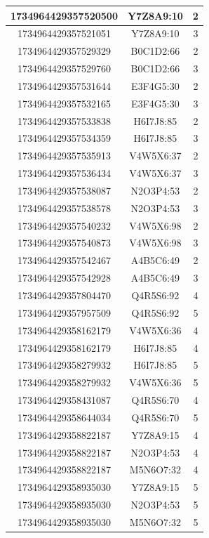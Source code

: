 \begin{table}[h]
\begin{tabular}{| c | c | c |}
		1734964429357520500 & Y7Z8A9:10 & 2 \\\hline
		1734964429357521051 & Y7Z8A9:10 & 3 \\\hline
		1734964429357529329 & B0C1D2:66 & 2 \\\hline
		1734964429357529760 & B0C1D2:66 & 3 \\\hline
		1734964429357531644 & E3F4G5:30 & 2 \\\hline
		1734964429357532165 & E3F4G5:30 & 3 \\\hline
		1734964429357533838 & H6I7J8:85 & 2 \\\hline
		1734964429357534359 & H6I7J8:85 & 3 \\\hline
		1734964429357535913 & V4W5X6:37 & 2 \\\hline
		1734964429357536434 & V4W5X6:37 & 3 \\\hline
		1734964429357538087 & N2O3P4:53 & 2 \\\hline
		1734964429357538578 & N2O3P4:53 & 3 \\\hline
		1734964429357540232 & V4W5X6:98 & 2 \\\hline
		1734964429357540873 & V4W5X6:98 & 3 \\\hline
		1734964429357542467 & A4B5C6:49 & 2 \\\hline
		1734964429357542928 & A4B5C6:49 & 3 \\\hline
		1734964429357804470 & Q4R5S6:92 & 4 \\\hline
		1734964429357957509 & Q4R5S6:92 & 5 \\\hline
		1734964429358162179 & V4W5X6:36 & 4 \\\hline
		1734964429358162179 & H6I7J8:85 & 4 \\\hline
		1734964429358279932 & H6I7J8:85 & 5 \\\hline
		1734964429358279932 & V4W5X6:36 & 5 \\\hline
		1734964429358431087 & Q4R5S6:70 & 4 \\\hline
		1734964429358644034 & Q4R5S6:70 & 5 \\\hline
		1734964429358822187 & Y7Z8A9:15 & 4 \\\hline
		1734964429358822187 & N2O3P4:53 & 4 \\\hline
		1734964429358822187 & M5N6O7:32 & 4 \\\hline
		1734964429358935030 & Y7Z8A9:15 & 5 \\\hline
		1734964429358935030 & N2O3P4:53 & 5 \\\hline
		1734964429358935030 & M5N6O7:32 & 5 \\\hline

\end{tabular}
\end{table}
